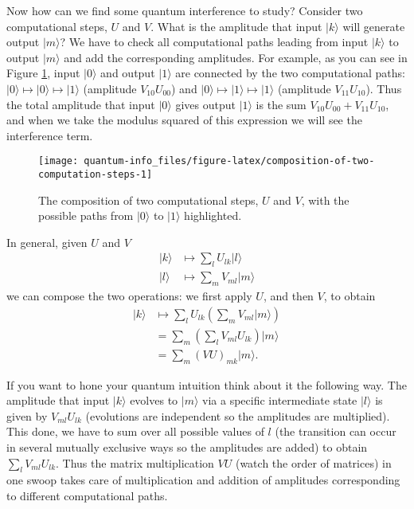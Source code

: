 \documentclass[fleqn]{article}
\begin{document}
Now how can we find some quantum interference to study?
Consider two computational steps, \(U\) and \(V\).
What is the amplitude that input \(|k\rangle\) will generate output \(|m\rangle\)?
We have to check all computational paths leading from input \(|k\rangle\) to output \(|m\rangle\) and add the corresponding amplitudes.
For example, as you can see in Figure \ref{fig:composition-of-two-computation-steps}, input \(|0\rangle\) and output \(|1\rangle\) are connected by the two computational paths: \(|0\rangle\mapsto|0\rangle\mapsto|1\rangle\) (amplitude \(V_{10}U_{00}\)) and \(|0\rangle\mapsto|1\rangle\mapsto|1\rangle\) (amplitude \(V_{11}U_{10}\)).
Thus the total amplitude that input \(|0\rangle\) gives output \(|1\rangle\) is the sum \(V_{10}U_{00}+V_{11}U_{10}\), and when we take the modulus squared of this expression we will see the interference term.



\begin{figure}[H]

{\centering \texttt{[image: quantum-info\_files/figure-latex/composition-of-two-computation-steps-1]} 

}

\caption{The composition of two computational steps, \(U\) and \(V\), with the possible paths from \(|0\rangle\) to \(|1\rangle\) highlighted.}\label{fig:composition-of-two-computation-steps}
\end{figure}

In general, given \(U\) and \(V\)
\[
  \begin{aligned}
    |k\rangle
    &\longmapsto
    \sum_l U_{lk}|l\rangle
  \\|l\rangle
    &\longmapsto
    \sum_m V_{ml}|m\rangle
  \end{aligned}
\]
we can compose the two operations: we first apply \(U\), and then \(V\), to obtain
\[
  \begin{aligned}
    |k\rangle
    &\longmapsto
    \sum_l U_{lk} \left(
      \sum_m V_{ml}|m\rangle
    \right)
  \\&=
    \sum_m \left(
      \sum_l V_{ml}U_{lk}
    \right) |m\rangle
  \\&=
    \sum_m (VU)_{mk} |m\rangle.
  \end{aligned}
\]

If you want to hone your quantum intuition think about it the following way.
The amplitude that input \(|k\rangle\) evolves to \(|m\rangle\) via a specific intermediate state \(|l\rangle\) is given by \(V_{ml}U_{lk}\) (evolutions are independent so the amplitudes are multiplied).
This done, we have to sum over all possible values of \(l\) (the transition can occur in several mutually exclusive ways so the amplitudes are added) to obtain \(\sum_l V_{ml}U_{lk}\).
Thus the matrix multiplication \(VU\) (watch the order of matrices) in one swoop takes care of multiplication and addition of amplitudes corresponding to different computational paths.
\end{document}
